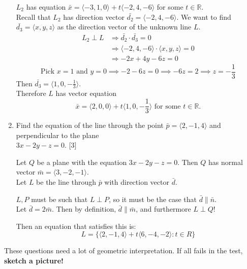 \documentclass[11pt]{article}
\begin{document}
\begin{enumerate}[label=\alph*), series=Last]
    \color{blue}
    \(L_2\) has equation \(\bar{x} = \langle-3,1,0\rangle + t\langle-2,4,-6\rangle \) for some \(t \in \mathbb{R}\).\\
    Recall that \(L_2\) has direction vector \(\bar{d_2} = \langle-2,4,-6\rangle\). We want to find \(\bar{d_3} = \langle x,y,z\rangle\) as the direction vector 
    of the unknown line \(L\).
    \[
        \begin{aligned}
            L_2 \perp L &\Rightarrow \bar{d_2} \cdot \bar{d_3} = 0\\
            &\Rightarrow\langle-2,4,-6\rangle \cdot \langle x,y,z\rangle =0\\
            &\Rightarrow -2x+4y-6z = 0
        \end{aligned}
    \]
    \[
    \text{Pick } x = 1 \text{ and } y = 0 \implies -2-6z = 0 \implies -6z = 2 \implies z = -\frac{1}{3}
    \]
    Then \(\bar{d_3} = \langle 1,0, -\frac{1}{3} \rangle\).\\
    Therefore \(L\) has vector equation
    \[
    \bar{x} = \langle 2,0,0 \rangle + t\langle 1,0, -\frac{1}{3} \rangle \text{ for some } t \in \mathbb{R}.\]
    \color{black}
    \item Find the equation of the line through the point \(\bar{p} = \langle2,-1,4\rangle\) and perpendicular to the
    plane\\ \(3x-2y-z=0\). \hfill [3]

    \color{blue}
    Let \(Q\) be a plane with the equation \(3x-2y-z=0\). Then \(Q\) has normal vector \(\bar{m} = \langle 3,-2,-1\rangle\).\\
    Let \(L\) be the line through \(\bar{p}\) with direction vector \(\bar{d}\).

    \vspace{1em}

    \(L, P\) must be such that \(L \perp P\), so it must be the case that \(\bar{d} \parallel\bar{n}\).\\ Let \(\bar{d} = 2\bar{m}\). Then by definition,
    \(\bar{d}\parallel\bar{m}\), and furthermore \(L\perp Q\)!

    Then an equation that satisfies this is:
    \[
    L = \{\langle 2,-1,4\rangle + t\langle 6,-4,-2\rangle : t \in R\}
    \]
\end{enumerate}

\begin{remarkbox}
    These questions need a lot of geometric interpretation. If all fails in the test, \textbf{sketch a picture!}
\end{remarkbox}
\end{document}
